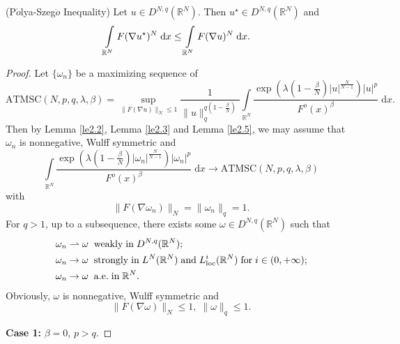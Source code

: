 \documentclass[10pt,a4paper]{amsart}
\newcommand{\R}{\mathbb{R}}
\begin{document}
\begin{lemma}\label{le2.2}(P$\acute{o}$lya-Szeg$\ddot{o}$ Inequality)
Let $u\in D^{N,q}(\R^{N})$. Then $u^{\star}\in D^{N,q}(\R^{N})$ and
\begin{align}
    &\int\limits_{\R^{N}}F(\nabla u^{\star})^{N}\;\mathrm{d}x   \leq\int\limits_{\R^{N}}F(\nabla u)^{N}\;\mathrm{d}x.\notag
\end{align}
\end{lemma}

\begin{proof}
Let $\{\omega_{n}\}$ be a maximizing sequence of
$$
\mathrm{ATMSC}(N,p,q,\lambda,\beta)=\sup\limits_{\|F(\nabla u)\|_{N}\leq 1}\frac{1}{\|u\|_{q}^{q(1-\frac{\beta}{N})}}\int\limits_{\R^{N}}\frac{\exp(\lambda(1-\frac{\beta}{N})\lvert u\rvert^{\frac{N}{N-1}})\lvert u\rvert^{p}}{F^{o}(x)^{\beta}}\;\mathrm{d}x.
$$
Then by Lemma \ref{le2.2}, Lemma \ref{le2.3} and Lemma \ref{le2.5}, we may assume that $\omega_{n}$ is nonnegative, Wulff symmetric and
$$
\int\limits_{\R^{N}}\frac{\exp(\lambda(1-\frac{\beta}{N})\lvert \omega_{n}\rvert^{\frac{N}{N-1}})\lvert \omega_{n}\rvert^{p}}{F^{o}(x)^{\beta}}\;\mathrm{d}x\rightarrow\mathrm{ATMSC}(N,p,q,\lambda,\beta)
$$
with
$$
\|F(\nabla\omega_{n})\|_{N}=\|\omega_{n}\|_{q}=1.
$$
For $q>1$, up to a subsequence, there exists some $\omega\in D^{N,q}(\R^{N})$ such that
\begin{align}
    &\omega_{n}\rightharpoonup \omega\;\;\mathrm{weakly}\;\mathrm{in}\;D^{N,q}(\R^{N})\textup{;}\notag\\
    &\omega_{n}\rightarrow \omega\;\;\mathrm{strongly}\;\mathrm{in}\;L^{N}(\R^{N})\;\mathrm{and}\;L_{\mathrm{loc}}^{i}(\R^{N})\;\mathrm{for}\;i\in(0,+\infty)\textup{;}\notag\\
    &\omega_{n}\rightarrow \omega\;\;\mathrm{a.e.}\;\mathrm{in}\;\R^{N}.\notag
\end{align}
Obviously, $\omega$ is nonnegative, Wulff symmetric and
$$
\|F(\nabla\omega)\|_{N}\leq1,\;\|\omega\|_{q}\leq1.
$$

{\bfseries Case 1:} $\beta=0$, $p>q$.


\end{proof}
\end{document}
